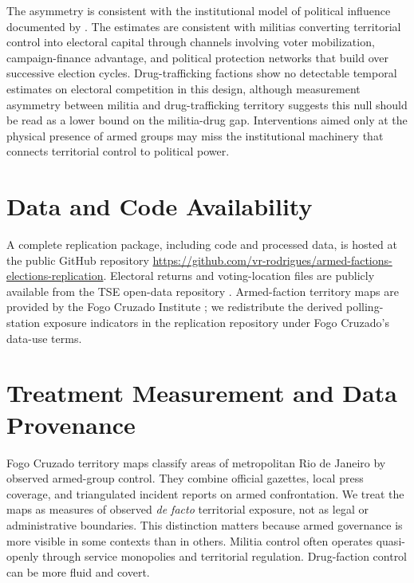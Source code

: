 \documentclass[11pt]{article}
\begin{document}
The asymmetry is consistent with the institutional model of political influence documented by \citet{pantaleao2025elections}. The estimates are consistent with militias converting territorial control into electoral capital through channels involving voter mobilization, campaign-finance advantage, and political protection networks that build over successive election cycles. Drug-trafficking factions show no detectable temporal estimates on electoral competition in this design, although measurement asymmetry between militia and drug-trafficking territory suggests this null should be read as a lower bound on the militia-drug gap. Interventions aimed only at the physical presence of armed groups may miss the institutional machinery that connects territorial control to political power.

\section*{Data and Code Availability}

A complete replication package, including code and processed data, is hosted at the public GitHub repository \url{https://github.com/vr-rodrigues/armed-factions-elections-replication}. Electoral returns and voting-location files are publicly available from the TSE open-data repository \citep{tse2024}. Armed-faction territory maps are provided by the Fogo Cruzado Institute \citep{fogocruzado2024}; we redistribute the derived polling-station exposure indicators in the replication repository under Fogo Cruzado's data-use terms.

\vspace{8pt}
{\small\linespread{1.0}\selectfont

}

\clearpage
\appendix
\section{Treatment Measurement and Data Provenance}\label{app:measurement}

Fogo Cruzado territory maps classify areas of metropolitan Rio de Janeiro by observed armed-group control. They combine official gazettes, local press coverage, and triangulated incident reports on armed confrontation. We treat the maps as measures of observed \textit{de facto} territorial exposure, not as legal or administrative boundaries. This distinction matters because armed governance is more visible in some contexts than in others. Militia control often operates quasi-openly through service monopolies and territorial regulation. Drug-faction control can be more fluid and covert.
\end{document}
